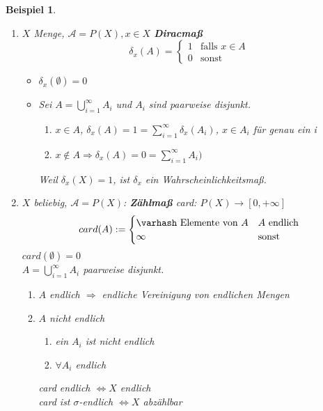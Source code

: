 \documentclass[11pt]{memoir}
\theoremstyle{changebreak}
\newtheorem{Beispiel}{Beispiel}[chapter]
\begin{document}
\begin{Beispiel}
\begin{enumerate}
	\item $X$ Menge, $\mathscr{A} = P(X), x \in X$ \textbf{Diracmaß}
	\begin{equation}
		\delta_{x} (A) =
		\begin{cases}
			1 & \text{falls } x \in A\\
			0 & \text{sonst}
		\end{cases}
	\end{equation}
	\begin{itemize}
		\item $\delta_x ( \emptyset) = 0$
		\item Sei $A = \bigcup\limits_{i=1}^{\infty} A_i$ und $A_i$ sind paarweise disjunkt.
		\begin{enumerate}
			\item $x \in A$, $\delta_x(A) = 1 = \sum\limits_{i=1}^{\infty} \delta_x(A_i)$, $x \in A_i$ für genau ein i
			\item $x \notin A \Rightarrow \delta_x(A) = 0 = \sum\limits_{i=1}^{\infty}A_i)$
					\end{enumerate}
		Weil $\delta_x(X) = 1$, ist $\delta_x$ ein Wahrscheinlichkeitsmaß.
	\end{itemize}
	\item $X$ beliebig, $\mathscr{A} = P(X)$: \textbf{Zählmaß} card: $P(X) \rightarrow [0, +\infty]$
	\begin{equation}
		card(A) :=
		\begin{cases}
			\varhash \text{ Elemente von } A & A \text{ endlich} \\
			\infty & \text{sonst}
		\end{cases}
	\end{equation}
	$card(\emptyset) = 0$ \\
	$A = \bigcup\limits_{i=1}^{\infty} A_i$ paarweise disjunkt.
	\begin{enumerate}
		\item $A$ endlich $\Rightarrow$ endliche Vereinigung von endlichen Mengen
		\item $A$ nicht endlich
		\begin{enumerate}
			\item ein $A_i$ ist nicht endlich
			\item $\forall A_i$ endlich
		\end{enumerate}
		card endlich $\Leftrightarrow X$ endlich \\
		card ist $\sigma$-endlich $\Leftrightarrow X$ abzählbar
	\end{enumerate}
\end{enumerate}
\end{Beispiel}
\end{document}
